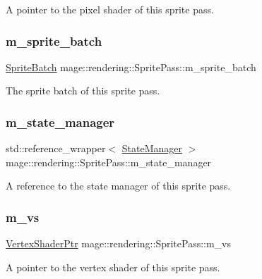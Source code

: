 A pointer to the pixel shader of this sprite pass. \hypertarget{classmage_1_1rendering_1_1_sprite_pass_a458633552d664181db78adb6c52a5f22}{}\label{classmage_1_1rendering_1_1_sprite_pass_a458633552d664181db78adb6c52a5f22} 
\subsubsection{\texorpdfstring{m\+\_\+sprite\+\_\+batch}{m\_sprite\_batch}}
{\footnotesize\ttfamily \hyperlink{classmage_1_1rendering_1_1_sprite_batch}{Sprite\+Batch} mage\+::rendering\+::\+Sprite\+Pass\+::m\+\_\+sprite\+\_\+batch\hspace{0.3cm}{\ttfamily [private]}}

The sprite batch of this sprite pass. \hypertarget{classmage_1_1rendering_1_1_sprite_pass_a60241eeab6141da050b1c61979894539}{}\label{classmage_1_1rendering_1_1_sprite_pass_a60241eeab6141da050b1c61979894539} 
\subsubsection{\texorpdfstring{m\+\_\+state\+\_\+manager}{m\_state\_manager}}
{\footnotesize\ttfamily std\+::reference\+\_\+wrapper$<$ \hyperlink{classmage_1_1rendering_1_1_state_manager}{State\+Manager} $>$ mage\+::rendering\+::\+Sprite\+Pass\+::m\+\_\+state\+\_\+manager\hspace{0.3cm}{\ttfamily [private]}}

A reference to the state manager of this sprite pass. \hypertarget{classmage_1_1rendering_1_1_sprite_pass_a05c13379108ffa463958e8addabdcccf}{}\label{classmage_1_1rendering_1_1_sprite_pass_a05c13379108ffa463958e8addabdcccf} 
\subsubsection{\texorpdfstring{m\+\_\+vs}{m\_vs}}
{\footnotesize\ttfamily \hyperlink{namespacemage_1_1rendering_aaf704b9c54a4181f4950a1761de69dda}{Vertex\+Shader\+Ptr} mage\+::rendering\+::\+Sprite\+Pass\+::m\+\_\+vs\hspace{0.3cm}{\ttfamily [private]}}

A pointer to the vertex shader of this sprite pass. 